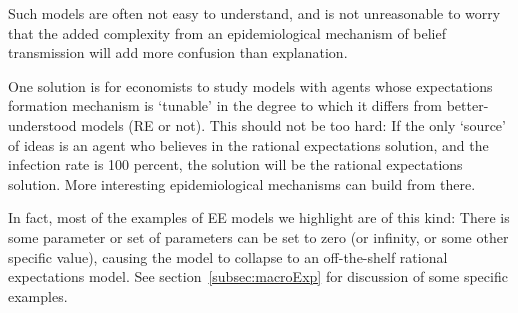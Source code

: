     Such models are often not easy to understand, and is not unreasonable to worry that the added complexity from an epidemiological mechanism of belief transmission will add more confusion than explanation.

    One solution is for economists to study models with agents whose expectations formation mechanism is `tunable' in the degree to which it differs from better-understood models (RE or not).  This should not be too hard:  If the only `source' of ideas is an agent who believes in the rational expectations solution, and the infection rate is 100 percent, the solution will be the rational expectations solution.  More interesting epidemiological mechanisms can build from there.

    In fact, most of the examples of EE models we highlight are of this kind: There is some parameter or set of parameters can be set to zero (or infinity, or some other specific value), causing the model to collapse to an off-the-shelf rational expectations model.  See section~\ref{subsec:macroExp} for discussion of some specific examples.

